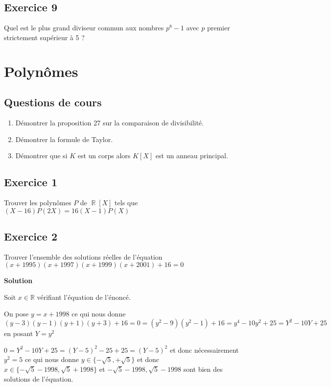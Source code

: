 \documentclass{article}
\DeclareMathOperator{\R}{\mathbb{R}}
\begin{document}
\subsection*{Exercice 9} 

Quel est le plus grand diviseur commun aux nombres $p^8 - 1$ avec $p$ premier strictement supérieur à 5 ?  

\clearpage

\section{Polynômes} 

\subsection*{Questions de cours} 

\begin{enumerate}
    \item Démontrer la proposition 27 sur la comparaison de divisibilité. 
    \item Démontrer la formule de Taylor. 
    \item Démontrer que si $K$ est un corps alors $K[X]$ est un anneau principal. 
\end{enumerate}

\subsection*{Exercice 1} 

Trouver les polynômes $P$ de $\R[X]$ tels que $(X-16)P(2X) = 16(X-1)P(X)$ 

\subsection*{Exercice 2} 

Trouver l'ensemble des solutions réelles de l'équation $(x+1995)(x+1997)(x+1999)(x+2001) + 16 = 0$ 

\textbf{Solution} 

Soit $x\in \mathbb{R}$ vérifiant l'équation de l'énoncé.

On pose $y = x + 1998$ ce qui nous donne $(y-3)(y-1)(y+1)(y+3) + 16 = 0 = (y^2 - 9)(y^2 - 1) + 16 = y^4 - 10y ^2 + 25 = Y^2 - 10Y + 25$ en posant $Y = y^2$ 

$0 = Y^2 - 10Y + 25 = (Y - 5)^2 - 25 + 25 = (Y-5)^2$ et donc nécessairement $y^2 = 5$ ce qui nous donne $y \in \{ -\sqrt{5}, +\sqrt{5} \}$ et donc $x \in \{ -\sqrt{5} - 1998, \sqrt{5}+1998 \}$ et $ -\sqrt{5} - 1998, \sqrt{5}-1998$ sont bien des solutions de l'équation. 
\end{document}
